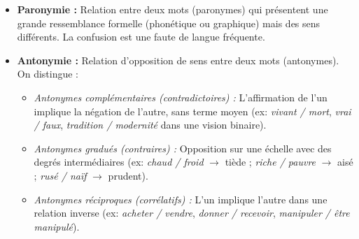 \documentclass[11pt]{article}
\begin{document}
\begin{definition}
\begin{itemize}
    \item \textbf{Paronymie :} Relation entre deux mots (paronymes) qui présentent une grande ressemblance formelle (phonétique ou graphique) mais des sens différents. La confusion est une faute de langue fréquente.
    \item \textbf{Antonymie :} Relation d'opposition de sens entre deux mots (antonymes). On distingue :
        \begin{itemize}
            \item \emph{Antonymes complémentaires (contradictoires) :} L'affirmation de l'un implique la négation de l'autre, sans terme moyen (ex: \emph{vivant / mort}, \emph{vrai / faux}, \emph{tradition / modernité} dans une vision binaire).
            \item \emph{Antonymes gradués (contraires) :} Opposition sur une échelle avec des degrés intermédiaires (ex: \emph{chaud / froid} $\rightarrow$ tiède ; \emph{riche / pauvre} $\rightarrow$ aisé ; \emph{rusé / naïf} $\rightarrow$ prudent).
            \item \emph{Antonymes réciproques (corrélatifs) :} L'un implique l'autre dans une relation inverse (ex: \emph{acheter / vendre}, \emph{donner / recevoir}, \emph{manipuler / être manipulé}).
        \end{itemize}
\end{itemize}
\end{definition}
\end{document}

